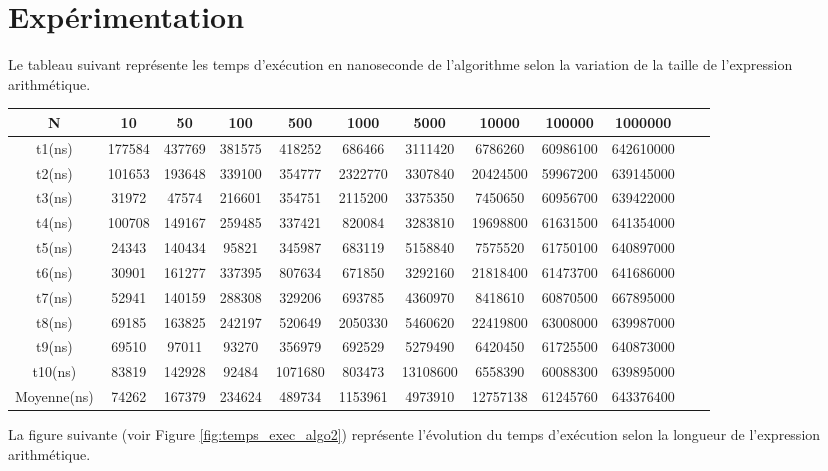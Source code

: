 \section{Expérimentation}
Le tableau suivant représente les temps d'exécution en nanoseconde de l'algorithme selon la variation de la taille de l'expression arithmétique.\\
\small
\begin{tabular}{| c | c | c | c | c | c | c | c | c | c | c | c |}
    \hline
    N &  10 & 50 & 100 & 500 & 1000 & 5000 & 10000 & 100000 & 1000000 \\
    \hline
    t1(ns) & 177584 & 437769 & 381575 & 418252 & 686466 & 3111420 & 6786260 & 60986100 & 642610000 \\
    \hline
    t2(ns) & 101653 & 193648 & 339100 & 354777 & 2322770 & 3307840 & 20424500 & 59967200 & 639145000 \\
    \hline
    t3(ns) & 31972 & 47574 & 216601 & 354751 & 2115200 & 3375350 & 7450650 & 60956700 & 639422000 \\
    \hline
    t4(ns) & 100708 & 149167 & 259485 & 337421 & 820084 & 3283810 & 19698800 & 61631500 & 641354000 \\
    \hline
    t5(ns) & 24343 & 140434 & 95821 & 345987 & 683119 & 5158840 & 7575520 & 61750100 & 640897000 \\
    \hline
    t6(ns) & 30901 & 161277 & 337395 & 807634 & 671850 & 3292160 & 21818400 & 61473700 & 641686000 \\
    \hline
    t7(ns) & 52941 & 140159 & 288308 & 329206 & 693785 & 4360970 & 8418610 & 60870500 & 667895000 \\
    \hline
    t8(ns) & 69185 & 163825 & 242197 & 520649 & 2050330 & 5460620 & 22419800 & 63008000 & 639987000 \\
    \hline
    t9(ns) & 69510 & 97011 & 93270 & 356979 & 692529 & 5279490 & 6420450 & 61725500 & 640873000 \\
    \hline
    t10(ns) & 83819 & 142928 & 92484 & 1071680 & 803473 & 13108600 & 6558390 & 60088300 & 639895000 \\
    \hline
    Moyenne(ns) & 74262 & 167379 & 234624 & 489734 & 1153961 & 4973910 & 12757138 & 61245760 & 643376400 \\
    \hline
\end{tabular}
\normalsize
\par
La figure suivante (voir Figure \ref{fig:temps_exec_algo2}) représente l'évolution du temps d'exécution selon la longueur de l'expression arithmétique.

